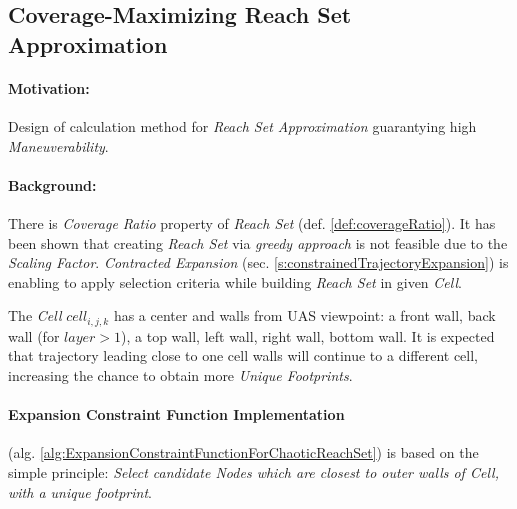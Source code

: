 \subsection{Coverage-Maximizing Reach Set Approximation}\label{s:chaoticReachSet}

\paragraph{Motivation:} Design of calculation method for \emph{Reach Set Approximation} guarantying high \emph{Maneuverability}.

\paragraph{Background:}There is \emph{Coverage Ratio} property of \emph{Reach Set} (def. \ref{def:coverageRatio}). It has been shown that creating \emph{Reach Set} via \emph{greedy approach} is not feasible due to the \emph{Scaling Factor}.  \emph{Contracted Expansion} (sec. \ref{s:constrainedTrajectoryExpansion}) is enabling to apply selection criteria while building \emph{Reach Set} in given \emph{Cell}. 

The \emph{Cell} $cell_{i,j,k}$ has a center and walls from UAS viewpoint: a front wall, back wall (for $layer > 1$), a top wall, left wall, right wall, bottom wall. It is expected that trajectory leading close to one cell walls will continue to a different cell, increasing the chance to obtain more \emph{Unique Footprints}. 

\paragraph{Expansion Constraint Function Implementation} (alg. \ref{alg:ExpansionConstraintFunctionForChaoticReachSet}) is based on the simple principle: \emph{Select candidate Nodes which are  closest to outer walls of Cell, with a unique footprint}.


